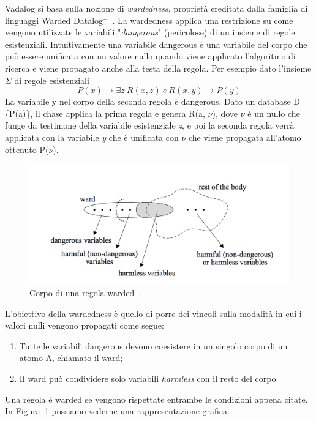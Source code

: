 Vadalog si basa sulla nozione di \emph{wardedness}, proprietà ereditata dalla famiglia di linguaggi Warded Datalog$^\pm$~\cite{gottlob2015beyond}. \newline
La wardedness applica una restrizione su come vengono utilizzate le variabili "\textit{dangerous}" (pericolose) di un insieme di regole esistenziali. Intuitivamente una variabile dangerous è una variabile del corpo che può essere unificata con un valore nullo quando viene applicato l'algoritmo di ricerca e viene propagato anche alla testa della regola.\newline
Per esempio dato l'insieme $\Sigma$ di regole esistenziali \[P(x) \rightarrow \exists z~R(x,z)~e~R(x,y) \rightarrow P(y)\]
La variabile y nel corpo della seconda regola è dangerous. Dato un database D = \{P(a)\}, il chase applica la prima regola e genera R(a, $\nu$), dove $\nu$ è un nullo che funge da testimone della variabile esistenziale \textit{z}, e poi la seconda regola verrà applicata con la variabile \textit{y} che è unificata con $\nu$ che viene propagata all'atomo ottenuto P($\nu$). \newline

\begin{figure}[h!]
	\centering
	\includegraphics[width=0.8\linewidth]{figure/wardedness}
	\caption{Corpo di una regola warded~\cite{gottlob2015beyond}.}
	\label{fig:wardedness}
\end{figure}
L'obiettivo della wardedness è quello di porre dei vincoli sulla modalità in cui i valori nulli vengono propagati come segue: 
\begin{enumerate}
	\item  Tutte le variabili dangerous devono coesistere in un singolo corpo di un atomo A, chiamato il ward;
	\item Il ward può condividere solo variabili \textit{harmless} con il resto del corpo.
\end{enumerate}
Una regola è warded se vengono rispettate entrambe le condizioni appena citate. In Figura~\ref{fig:wardedness} possiamo vederne una rappresentazione grafica. \newline

